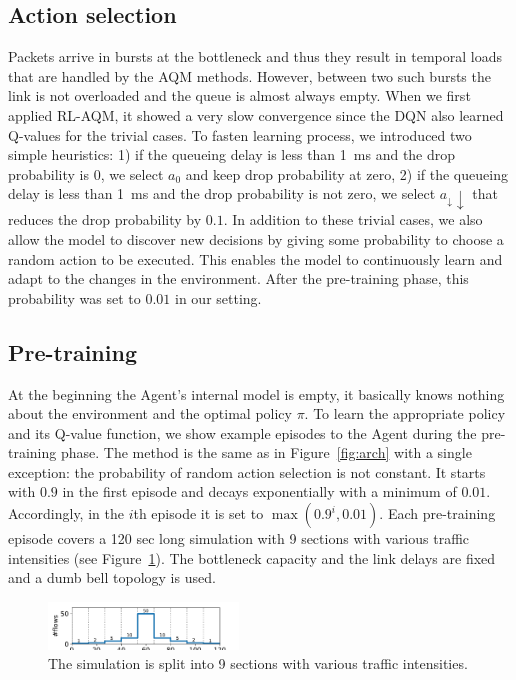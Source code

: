 \documentclass[conference]{IEEEtran}
\begin{document}
\subsection{Action selection}
Packets arrive in bursts at the bottleneck and thus they result in temporal loads that are handled by the AQM methods. However, between two such bursts the link is not overloaded and the queue is almost always empty. When we first applied RL-AQM, it showed a very slow convergence since the DQN also learned Q-values for the trivial cases. To fasten learning process, we introduced two simple heuristics: 1) if the queueing delay is less than 1~ms and the drop probability is 0, we select $a_0$ and keep drop probability at zero, 2) if the queueing delay is less than 1~ms and the drop probability is not zero, we select $a_\downarrow\downarrow$ that reduces the drop probability by $0.1$. In addition to these trivial cases, we also allow the model to discover new decisions by giving some probability to choose a random action to be executed. This enables the model to continuously learn and adapt to the changes in the environment. After the pre-training phase, this probability was set to $0.01$ in our setting.

\subsection{Pre-training}
At the beginning the Agent's internal model is empty, it basically knows nothing about the environment and the optimal policy $\pi$. To learn the appropriate policy and its Q-value function, we show example episodes to the Agent during the pre-training phase. The method is the same as in Figure~\ref{fig:arch} with a single exception: the probability of random action selection is not constant. It starts with $0.9$ in the first episode and decays exponentially with a minimum of $0.01$. Accordingly, in the $i$th episode it is set to $\max(0.9^i, 0.01)$. Each pre-training episode covers a 120 sec long simulation with 9 sections with various traffic intensities (see Figure~\ref{fig:numflows}). The bottleneck capacity and the link delays are fixed and a dumb bell topology is used.

\begin{figure}[t]
\begin{center}
\includegraphics[width=0.45\textwidth]{Figures/flownum.pdf}
\end{center}
\caption{The simulation is split into 9 sections with various traffic intensities.}
\label{fig:numflows}
\end{figure}
\end{document}
